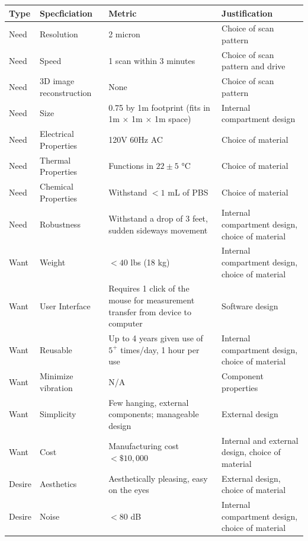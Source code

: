 \documentclass{article}
\begin{document}
\begin{table}[H]
  \centering
  \begin{tabularx}{\textwidth}{llXX}
    \toprule
    \textbf{Type} & \textbf{Specficiation} & \textbf{Metric} & \textbf{Justification} \\
    \hline
    Need & Resolution & 2 micron & Choice of scan pattern \\
    Need & Speed & 1 scan within 3 minutes & Choice of scan pattern and drive \\
    Need & 3D image reconstruction & None & Choice of scan pattern \\
    Need & Size & 0.75 by 1m footprint (fits in 1m $\times$ 1m $\times$ 1m space) & Internal compartment design \\
    Need & Electrical Properties & 120V 60Hz AC & Choice of material \\
    Need & Thermal Properties & Functions in $22\pm5$ °C & Choice of material \\
    Need & Chemical Properties & Withstand $<1$ mL of PBS & Choice of material \\
    Need & Robustness & Withstand a drop of 3 feet, sudden sideways movement & Internal compartment design, choice of material \\
    Want & Weight & $<40$ lbs (18 kg) & Internal compartment design, choice of material \\
    Want & User Interface & Requires 1 click of the mouse for measurement transfer from device to computer & Software design \\
    Want & Reusable & Up to 4 years given use of $5^+$ times/day, 1 hour per use & Internal compartment design, choice of material \\
    Want & Minimize vibration & N/A & Component properties \\
    Want & Simplicity & Few hanging, external components; manageable design & External design \\
    Want & Cost & Manufacturing cost $<\$10,000$ & Internal and external design, choice of material \\
    Desire & Aesthetics & Aesthetically pleasing, easy on the eyes & External design, choice of material \\
    Desire & Noise & $<80$ dB & Internal compartment design, choice of material \\
    \bottomrule
  \end{tabularx}
  \label{tab:eds}
\end{table}
\end{document}
